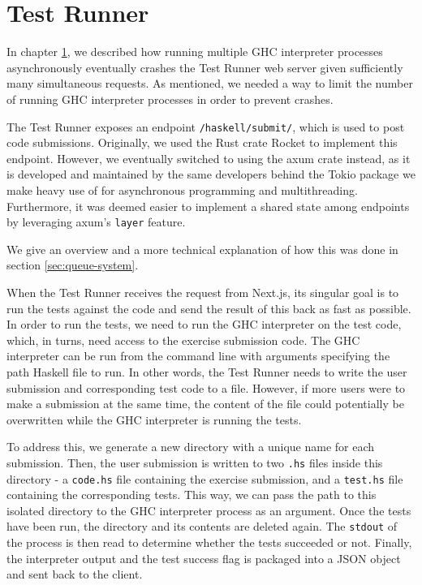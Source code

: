 \chapter{Test Runner} \label{chap:TestRunner}
In chapter \ref{chap:TestRunner}, we described how running multiple GHC interpreter processes asynchronously eventually crashes the Test Runner web server given sufficiently many simultaneous requests.
As mentioned, we needed a way to limit the number of running GHC interpreter processes in order to prevent crashes.

The Test Runner exposes an endpoint \texttt{/haskell/submit/}, which is used to post code submissions.
Originally, we used the Rust crate Rocket to implement this endpoint.
However, we eventually switched to using the axum crate instead, as it is developed and maintained by the same developers behind the Tokio package we make heavy use of for asynchronous programming and multithreading.
Furthermore, it was deemed easier to implement a shared state among endpoints by leveraging axum's \texttt{layer} feature.

We give an overview and a more technical explanation of how this was done in section \ref{sec:queue-system}.

When the Test Runner receives the request from Next.js, its singular goal is to run the tests against the code and send the result of this back as fast as possible.
In order to run the tests, we need to run the GHC interpreter on the test code, which, in turns, need access to the exercise submission code.
The GHC interpreter can be run from the command line with arguments specifying the path Haskell file to run.
In other words, the Test Runner needs to write the user submission and corresponding test code to a file.
However, if more users were to make a submission at the same time, the content of the file could potentially be overwritten while the GHC interpreter is running the tests.

To address this, we generate a new directory with a unique name for each submission.
Then, the user submission is written to two  \texttt{.hs} files inside this directory - a \texttt{code.hs} file containing the exercise submission, and a \texttt{test.hs} file containing the corresponding tests.
This way, we can pass the path to this isolated directory to the GHC interpreter process as an argument.
Once the tests have been run, the directory and its contents are deleted again.
The \texttt{stdout} of the process is then read to determine whether the tests succeeded or not.
Finally, the interpreter output and the test success flag is packaged into a JSON object and sent back to the client.

